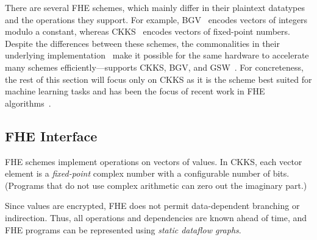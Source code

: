 There are several FHE schemes, which mainly differ in their plaintext datatypes and the operations they support.
For example, BGV~\cite{brakerski:toct14:leveled} encodes vectors of integers modulo a constant,
whereas CKKS~\cite{cheon:ictaci17:homomorphic} encodes vectors of fixed-point numbers.
Despite the differences between these schemes, %
the commonalities in their underlying implementation~\cite{lyubashevsky:tact10:ideal}
make it possible for the same hardware to
accelerate many schemes
efficiently---\name supports CKKS, BGV, and GSW~\cite{gentry:crypto13:homomorphic}.
For concreteness, the rest of this section will focus only on CKKS as it
is the scheme best suited for machine learning tasks and has been the focus of
recent work in FHE algorithms~\cite{han:iacr18:efficient,lee:2021:privacy,gilad:icml16:cryptonets,podschwadt:2020:classification,dathathri:pldi19:chet,dathathri:pldi20:eva}.

\subsection{FHE Interface}
\label{sec:fhe_mapping}

FHE schemes implement operations on vectors of values.
In CKKS, each vector element is a \emph{fixed-point} complex number with a configurable number of bits.
(Programs that do not use complex arithmetic can zero out the imaginary part.)

Since values are encrypted, FHE does not permit data-dependent branching or indirection.
Thus, all operations and dependencies are known ahead of time, and FHE programs can
be represented using \emph{static dataflow graphs}.

